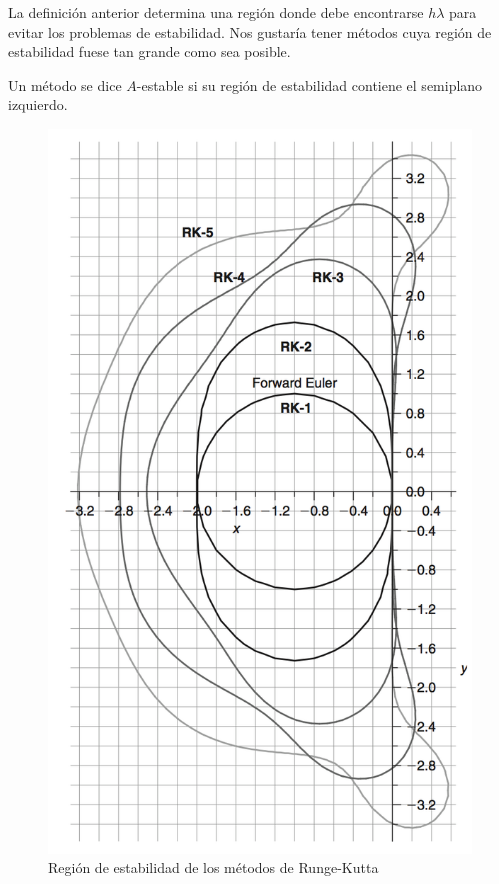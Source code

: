 \begin{remark}
    La definición anterior determina una región donde
    debe encontrarse $h\lambda$ para evitar los problemas de estabilidad.
    Nos gustaría tener métodos
    cuya región de estabilidad fuese tan grande como sea posible.
\end{remark}

\begin{definition}
    Un método se dice $A$-estable si su región de estabilidad
    contiene el semiplano izquierdo.
\end{definition}

\begin{figure}[p]
    \centering
    \includegraphics{media/RK-A-stability-regions.png}
    \caption{Región de estabilidad de los métodos de Runge-Kutta}
\end{figure}


